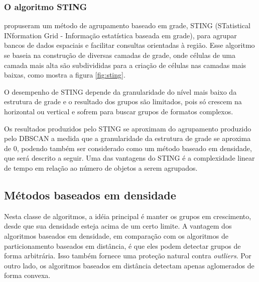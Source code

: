 \subsubsection{O algoritmo STING}
\cite{Wang1997} propuseram um método de agrupamento baseado em grade, STING (STatistical INformation Grid - Informação estatística baseada em grade), para agrupar bancos de dados espaciais e facilitar consultas orientadas à região. Esse algoritmo se baseia na construção de diversas camadas de grade, onde células de uma camada mais alta são subdivididas para a criação de células nas camadas mais baixas, como mostra a figura \ref{fig:sting}.

\begin{figure}[!ht]
	\centering	
\end{figure}

O desempenho de STING depende da granularidade do nível mais baixo da estrutura de grade e o resultado dos
grupos são limitados, pois só crescem na horizontal ou vertical e sofrem para buscar grupos de formatos complexos.

Os resultados produzidos pelo STING se aproximam do agrupamento produzido pelo
DBSCAN a medida que a granularidade da estrutura de grade se aproxima de 0, podendo
também ser considerado como um método baseado em densidade, que será descrito a seguir.
Uma das vantagens do STING é a complexidade linear de tempo em relação ao número de objetos
a serem agrupados.

\subsection{Métodos baseados em densidade}
Nesta classe de algoritmos, a idéia principal é manter os grupos em crescimento, desde que sua densidade esteja acima de um certo limite. A vantagem dos algoritmos baseados em densidade, em comparação com os algoritmos de particionamento baseados em distância, é que eles podem detectar grupos de forma arbitrária. Isso também fornece uma proteção natural contra \textit{outliers}. Por outro lado, os algoritmos baseados em distância detectam apenas aglomerados de forma convexa.

